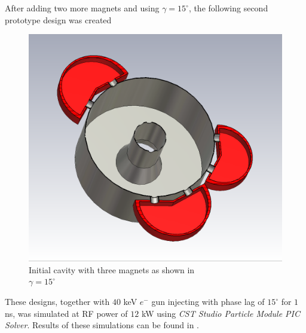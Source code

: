 \documentclass[a4paper,oneside,12pt]{report}
\numberwithin{equation}{chapter}
\begin{document}
After adding two more magnets and using $\gamma=15^\circ$, the following second prototype design was created
\begin{figure}[H]
    \centering
    \captionsetup{justification=centering}
    \includegraphics[width=.8\linewidth]{./figures/cst/cst_second_design2.png}
    \caption{Initial cavity with three magnets as shown in  \\ $\gamma=15^\circ$}
    \label{fig:initial_three_magnet_design}
\end{figure}
These designs, together with $40$ keV $e^-$ gun injecting with phase lag of $15^\circ$ for $1$ ns, was simulated at RF power of $12$ kW using \textit{CST Studio Particle Module PIC Solver}.
Results of these simulations can be found in .
\end{document}
